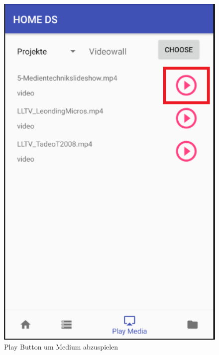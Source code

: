 \begin{figure}[H]
\centering
\includegraphics[width=1.0\textwidth]{images/06_AndroidApp/06_playMedia}
\caption{Play Button um Medium abzuspielen}
\label{fig:mediaNav}
\end{figure}
\\
